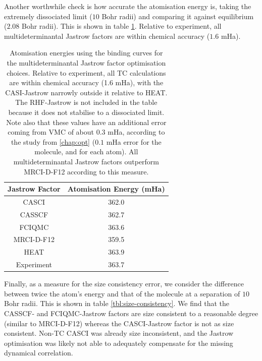 Another worthwhile check is how accurate the atomisation energy is, taking the extremely dissociated limit ($10$ Bohr radii) and comparing it against equilibrium ($2.08$ Bohr radii). This is shown in table \ref{tbl:binding-atomisation-energies}. Relative to experiment, all multideterminantal Jastrow factors are within chemical accuracy ($1.6$ mHa).

\begin{table}[htbp]
    \centering
        \begin{tabular}{c|c}
            Jastrow Factor & Atomisation Energy (mHa) \\
            \hline
            CASCI & 362.0 \\
            CASSCF & 362.7 \\
            FCIQMC & 363.6 \\
            \bottomrule
            MRCI-D-F12 & 359.5 \\
            HEAT\supercite{fellerSurvey2008} & 363.9 \\
            Experiment\supercite{leroyAccurate2006} & 363.7
        \end{tabular}
    \caption{Atomisation energies using the binding curves for the multideterminantal Jastrow factor optimisation choices. Relative to experiment, all TC calculations are within chemical accuracy (1.6 mHa), with the CASI-Jastrow narrowly outside it relative to HEAT. The RHF-Jastrow is not included in the table because it does not stabilise to a dissociated limit. Note also that these values have an additional error coming from VMC of about $0.3$ mHa, according to the study from \autoref{chap:opt} ($0.1$ mHa error for the molecule, and for each atom). All multideterminantal Jastrow factors outperform MRCI-D-F12 according to this measure.}
    \label{tbl:binding-atomisation-energies}
\end{table}

Finally, as a measure for the size consistency error, we consider the difference between twice the atom's energy and that of the molecule at a separation of $10$ Bohr radii. This is shown in table \ref{tbl:size-consistency}. We find that the CASSCF- and FCIQMC-Jastrow factors are size consistent to a reasonable degree (similar to MRCI-D-F12) whereas the CASCI-Jastrow factor is not as size consistent. Non-TC CASCI was already size inconsistent, and the Jastrow optimisation was likely not able to adequately compensate for the missing dynamical correlation.

